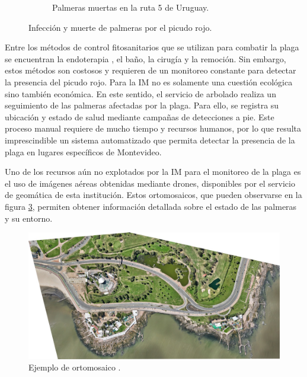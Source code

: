 \begin{figure}[htpb]
\begin{subfigure}[b]{0.49\textwidth}
    \caption{Palmeras muertas en la ruta 5 de Uruguay.}
    \label{fig:palmeras-ruta5}
  \end{subfigure}
  \caption{Infección y muerte de palmeras por el picudo rojo.}
  \label{fig:infeccion-y-muerte-palmeras}
\end{figure}

Entre los métodos de control fitosanitarios que se utilizan para combatir la plaga se encuentran la endoterapia \citep{intendencia_de_montevideo_acciones_nodate}, el baño, la cirugía \citep{sanchez_cirugiespecializada_nodate} y la remoción. Sin embargo, estos métodos son costosos y requieren de un monitoreo constante para detectar la presencia del picudo rojo. Para la IM no es solamente una cuestión ecológica sino también económica. En este sentido, el servicio de arbolado realiza un seguimiento de las palmeras afectadas por la plaga. Para ello, se registra su ubicación y estado de salud mediante campañas de detecciones a pie. Este proceso manual requiere de mucho tiempo y recursos humanos, por lo que resulta imprescindible un sistema automatizado que permita detectar la presencia de la plaga en lugares específicos de Montevideo.

Uno de los recursos aún no explotados por la IM para el monitoreo de la plaga es el uso de imágenes aéreas obtenidas mediante drones, disponibles por el servicio de geomática de esta institución. Estos ortomosaicos, que pueden observarse en la figura \ref{fig:ejemplo-ortomosaico}, permiten obtener información detallada sobre el estado de las palmeras y su entorno.

\begin{figure}[H]
  \centering
  \includegraphics[scale=0.5]{./Figures/ejemplo-ortomosaico.jpg}
  \caption{Ejemplo de ortomosaico \protect\footnotemark.}
  \label{fig:ejemplo-ortomosaico}
\end{figure}


